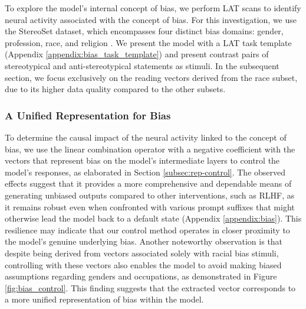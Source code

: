 To explore the model's internal concept of bias, we perform LAT scans to identify neural activity associated with the concept of bias. For this investigation, we use the StereoSet dataset, which encompasses four distinct bias domains: gender, profession, race, and religion \citep{nadeem-etal-2021-stereoset}. We present the model with a LAT task template (Appendix \ref{appendix:bias_task_template}) and present contrast pairs of stereotypical and anti-stereotypical statements as stimuli. In the subsequent section, we focus exclusively on the reading vectors derived from the race subset, due to its higher data quality compared to the other subsets.


\subsubsection{A Unified Representation for Bias}
To determine the causal impact of the neural activity linked to the concept of bias, we use the linear combination operator with a negative coefficient with the vectors that represent bias on the model's intermediate layers to control the model's responses, as elaborated in Section \ref{subsec:rep-control}. The observed effects suggest that it provides a more comprehensive and dependable means of generating unbiased outputs compared to other interventions, such as RLHF, as it remains robust even when confronted with various prompt suffixes that might otherwise lead the model back to a default state (Appendix \ref{appendix:bias}). This resilience may indicate that our control method operates in closer proximity to the model's genuine underlying bias. Another noteworthy observation is that despite being derived from vectors associated solely with racial bias stimuli, controlling with these vectors also enables the model to avoid making biased assumptions regarding genders and occupations, as demonstrated in Figure \ref{fig:bias_control}. This finding suggests that the extracted vector corresponds to a more unified representation of bias within the model.

